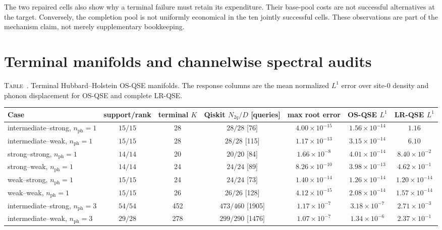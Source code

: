 \documentclass[
  reprint,
  amsmath,
  amssymb,
  aps,
  pra,
  nofootinbib,
  superscriptaddress,
  floatfix
]{revtex4-2}
\newcommand{\nph}{n_{\mathrm{ph}}}
\newcommand{\inlinetablecaption}[2]{%
  \refstepcounter{table}\label{#1}%
  \noindent\textsc{Table~\thetable.} #2\par\vspace{0.6ex}%
}
\begin{document}
The two repaired cells also show why a terminal failure must retain its
expenditure.  Their base-pool costs are not successful alternatives at the
target.  Conversely, the completion pool is not uniformly economical in the
ten jointly successful cells.  These observations are part of the mechanism
claim, not merely supplementary bookkeeping.

\section{Terminal manifolds and channelwise spectral audits}
\label{app:spectral_tables}

\begin{widetext}
\inlinetablecaption{tab:terminal_hh}{Terminal Hubbard--Holstein OS-QSE
manifolds.  The response columns are the mean normalized $L^1$ error over
site-0 density and phonon displacement for OS-QSE and complete LR-QSE.}
\begin{center}
\scriptsize
\begin{tabular*}{\textwidth}{@{\extracolsep{\fill}}lcccccc@{}}
\toprule
Case & support/rank & terminal $K$ & Qiskit $N_{2q}/D$ [queries] & max root error & OS-QSE $L^1$ & LR-QSE $L^1$ \\
\midrule
intermediate--strong, $\nph=1$ & $15/15$ & 28 & $28/28$ [76] & $4.00\times10^{-15}$ & $1.56\times10^{-14}$ & $1.16$ \\
intermediate--weak, $\nph=1$ & $15/15$ & 28 & $28/28$ [115] & $1.17\times10^{-13}$ & $3.15\times10^{-14}$ & $6.10$ \\
strong--strong, $\nph=1$ & $14/14$ & 20 & $20/20$ [84] & $1.66\times10^{-8}$ & $4.01\times10^{-14}$ & $8.40\times10^{-2}$ \\
strong--weak, $\nph=1$ & $14/14$ & 24 & $24/24$ [89] & $8.26\times10^{-10}$ & $3.98\times10^{-13}$ & $4.62\times10^{-1}$ \\
weak--strong, $\nph=1$ & $15/15$ & 24 & $24/24$ [73] & $1.40\times10^{-14}$ & $1.26\times10^{-14}$ & $1.20\times10^{-14}$ \\
weak--weak, $\nph=1$ & $15/15$ & 26 & $26/26$ [128] & $4.12\times10^{-15}$ & $2.08\times10^{-14}$ & $1.57\times10^{-14}$ \\
intermediate--strong, $\nph=3$ & $54/54$ & 452 & $473/460$ [1905] & $1.17\times10^{-7}$ & $3.18\times10^{-7}$ & $2.71\times10^{-3}$ \\
intermediate--weak, $\nph=3$ & $29/28$ & 278 & $299/290$ [1476] & $1.07\times10^{-7}$ & $1.34\times10^{-6}$ & $2.37\times10^{-1}$ \\

\end{tabular*}
\end{center}
\end{widetext}
\end{document}
